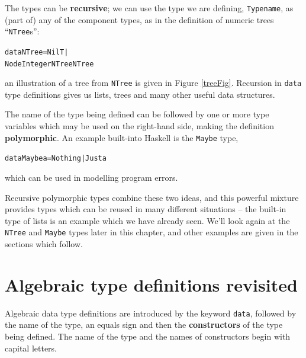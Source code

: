 \begin{titemize}
\item The types can be \textbf{recursive};
we can use the type we are defining,
\texttt{Typename}, as (part of) any of the component types, as in the definition of numeric trees ``\texttt{NTree}s'':
\begin{alltt}
data NTree = NilT |
             Node Integer NTree NTree
\end{alltt}
an illustration of a tree from \texttt{NTree} is given in Figure \ref{treeFig}. Recursion in \texttt{data} type definitions gives us
lists, trees and many other useful data structures.
\item The name of the type being defined can be followed by one or more type
variables which may be used on the right-hand side, making the definition
\textbf{polymorphic}. An example built-into Haskell is the \texttt{Maybe} type,
\begin{alltt}
data Maybe a = Nothing | Just a
\end{alltt}
which can be used in modelling program errors.
\end{titemize}
Recursive polymorphic types combine these two ideas, and this powerful
mixture provides types which can be reused in many different situations --
the built-in type of lists is an example which we have already seen. We'll look again at the \texttt{NTree} and \texttt{Maybe} types later in this chapter, and other
examples are given in the sections which follow.

\begin{webvideos}
\end{webvideos}

\section{Algebraic type definitions revisited}
\label{algRevisited}
Algebraic data type definitions are introduced by the keyword \texttt{data}, followed by
the name of the type, an equals sign and then the
\textbf{constructors} of the
type being defined.  The name of the type and the names of
constructors begin with
capital letters.

